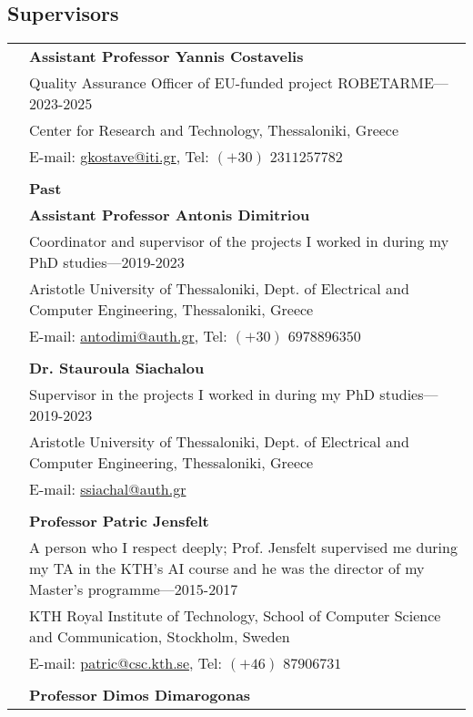 \documentclass[a4paper,10pt,twoside]{article}
\begin{document}
\subsection*{Supervisors}
\vspace{0.5cm}
\begin{tabular}{rp{14cm}}
& \textbf{Assistant Professor Yannis Costavelis} \\
  & {Quality Assurance Officer of EU-funded project ROBETARME}---2023-2025\\
& Center for Research and Technology, Thessaloniki, Greece \\
& E-mail: \href{mailto: gkostave@iti.gr}{gkostave@iti.gr}, Tel: $(+30)$ $2311 257782$ \\
&\\
& \textbf{Past}  \vspace{0.15cm} \\
& \textbf{Assistant Professor Antonis Dimitriou} \\
& {Coordinator and supervisor of the projects I worked in during my PhD studies}---2019-2023\\
&Aristotle University of Thessaloniki, Dept. of Electrical and Computer Engineering, Thessaloniki, Greece \\
& E-mail: \href{mailto: antodimi@auth.gr}{antodimi@auth.gr}, Tel: $(+30)$ $697 889 6350$ \\
&\\
& \textbf{Dr. Stauroula Siachalou} \\
& {Supervisor in the projects I worked in during my PhD studies}---2019-2023\\
&Aristotle University of Thessaloniki, Dept. of Electrical and Computer Engineering, Thessaloniki, Greece \\
& E-mail: \href{mailto: ssiachal@auth.gr}{ssiachal@auth.gr} \\
&\\
& \textbf{Professor Patric Jensfelt}\\
& {A person who I respect deeply; Prof. Jensfelt supervised me during my TA in the KTH's AI course and he was the director of my Master's programme}---2015-2017\\
&KTH Royal Institute of Technology, School of Computer Science and Communication, Stockholm, Sweden \\
& E-mail: \href{mailto: patric@csc.kth.se}{patric@csc.kth.se}, Tel: $(+46)$ $8 790 67 31$ \\
&\\
& \textbf{Professor Dimos Dimarogonas}\\

\end{tabular}
\end{document}
